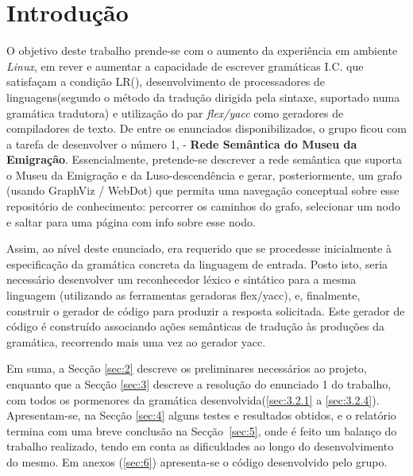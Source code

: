\documentclass[a4paper]{article}
\begin{document}
\section{Introdução}
\label{sec:1}
\hspace{3mm} O objetivo deste trabalho prende-se com o aumento da experiência em ambiente \textit{Linux}, em rever e aumentar a capacidade de escrever gramáticas I.C. que satisfaçam a condição LR(), desenvolvimento de processadores de linguagens(segundo o método da tradução dirigida pela sintaxe, suportado numa gramática tradutora) e utilização do par \textit{flex/yacc} como geradores de compiladores de texto. De entre os enunciados disponibilizados, o grupo ficou com a tarefa de desenvolver o número 1, - \textbf{Rede Semântica do Museu da Emigração}. Essencialmente, pretende-se descrever a rede semântica que suporta o Museu da Emigração e da Luso-descendência e gerar, posteriormente, um grafo (usando GraphViz / WebDot) que permita uma navegação conceptual sobre esse repositório de conhecimento: percorrer os caminhos do grafo, selecionar um nodo e saltar para uma página com info sobre esse nodo.
\par Assim, ao nível deste enunciado, era requerido que se procedesse inicialmente à especificação da gramática concreta da linguagem de entrada. Posto isto, seria necessário desenvolver um reconhecedor léxico e sintático para a mesma linguagem (utilizando as ferramentas geradoras flex/yacc), e, finalmente, construir o gerador de código para produzir a resposta solicitada. Este gerador de código é construído associando ações semânticas de tradução às produções da gramática, recorrendo mais uma vez ao gerador yacc.
\par Em suma, a Secção \ref{sec:2} descreve os preliminares necessários ao projeto, enquanto que a Secção \ref{sec:3} descreve a resolução do enunciado 1 do trabalho, com todos os pormenores da gramática desenvolvida(\ref{sec:3.2.1} a \ref{sec:3.2.4}). Apresentam-se, na Secção \ref{sec:4} alguns testes e resultados obtidos, e o relatório termina com uma breve conclusão na Secção~\ref{sec:5}, onde é feito um balanço do trabalho realizado, tendo em conta as dificuldades ao longo do desenvolvimento do mesmo. Em anexos (\ref{sec:6}) apresenta-se o código desenvolvido pelo grupo.




\pagebreak
\end{document}
